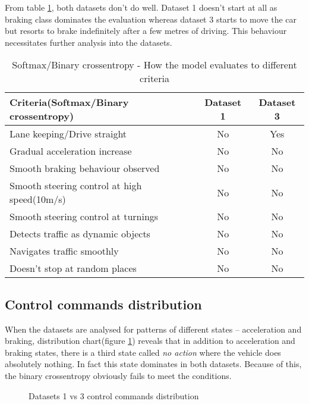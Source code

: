 From table \ref{table:softmaxandbce}, both datasets don't do well. Dataset 1 doesn't start
at all as braking class dominates the evaluation whereas dataset 3 starts to move the car
but resorts to brake indefinitely after a few metres of driving. This behaviour
necessitates further analysis into the datasets.
\begin{table}[h]
    \centering
\begin{tabular}{lcc}
    \toprule
    Criteria(Softmax/Binary crossentropy) & Dataset 1 & Dataset 3 \\\midrule
    Lane keeping/Drive straight  & No & Yes  \\
    Gradual acceleration increase & No & No\\
    Smooth braking behaviour observed & No & No \\
    Smooth steering control at high speed(10m/s) & No & No \\
    Smooth steering control at turnings & No & No\\
    Detects traffic as dynamic objects & No & No\\
    Navigates traffic smoothly & No & No\\
    Doesn't stop at random places & No & No \\\bottomrule
\end{tabular}
\caption{Softmax/Binary crossentropy - How the model evaluates to different criteria}
\label{table:softmaxandbce}
\end{table}
\iffalse
\begin{figure}[h]
	\centering
    \def\svgwidth{0.8\textwidth}
    \caption{Dataset 1 - Binary Crossentropy}
    \label{fig:ds1binarycrossentropy}
\end{figure}

\begin{figure}[h]
	\centering
    \def\svgwidth{0.8\textwidth}
    \caption{Dataset 3 - Binary Crossentropy}
    \label{fig:ds3binarycrossentropy}
\end{figure}
\fi
\subsection*{Control commands distribution}
When the datasets are analysed for patterns of different states -- acceleration and
braking, distribution chart(figure \ref{fig:datasetscomparectrlcmds}) reveals that in addition to
acceleration and braking states, there is a third state called \textit{no action} where
the vehicle does absolutely nothing. In fact this state dominates in both datasets.
Because of this, the binary crossentropy obviously fails to meet the conditions.
\begin{figure}[!ht]
    \centering
    \def\svgwidth{\textwidth}
    
    \caption{Datasets 1 vs 3 control commands distribution}
    \label{fig:datasetscomparectrlcmds}
\end{figure}

